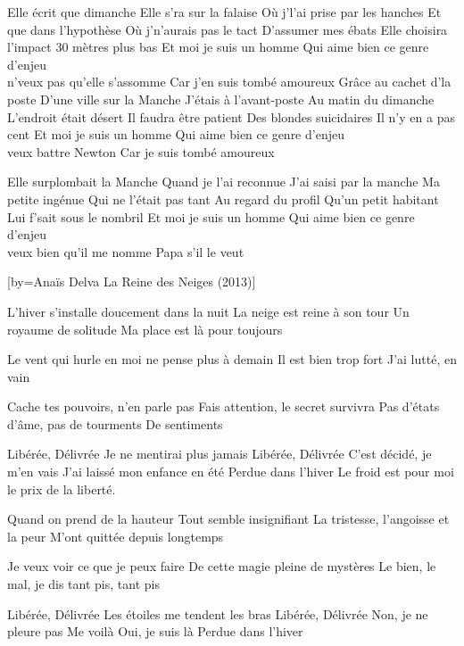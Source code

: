 \beginverse
Elle écrit que dimanche
Elle s'ra sur la falaise
Où j'l'ai prise par les hanches
Et que dans l'hypothèse
Où j'n'aurais pas le tact
D'assumer mes ébats
Elle choisira l'impact
30 mètres plus bas
Et moi je suis un homme
Qui aime bien ce genre d'enjeu
\\[Je] n'veux pas qu'elle s'assomme
Car j'en suis tombé amoureux
Grâce au cachet d'la poste
D'une ville sur la Manche
J'étais à l'avant-poste
Au matin du dimanche
L'endroit était désert
Il faudra être patient
Des blondes suicidaires
Il n'y en a pas cent
Et moi je suis un homme
Qui aime bien ce genre d'enjeu
\\[Je] veux battre Newton
Car je suis tombé amoureux
\endverse

\beginverse
Elle surplombait la Manche
Quand je l'ai reconnue
J'ai saisi par la manche
Ma petite ingénue
Qui ne l'était pas tant
Au regard du profil
Qu'un petit habitant
Lui f'sait sous le nombril
Et moi je suis un homme
Qui aime bien ce genre d'enjeu
\\[Je] veux bien qu'il me nomme
Papa \- s'il le veut
\endverse

[by={Anaïs Delva \- La Reine des Neiges (2013)}]

\beginverse
L'hiver s'installe doucement dans la nuit
La neige est reine à son tour
Un royaume de solitude
Ma place est là pour toujours
\endverse

\beginverse
Le vent qui hurle en moi ne pense plus à demain
Il est bien trop fort
J'ai lutté, en vain
\endverse

\beginverse
Cache tes pouvoirs, n'en parle pas
Fais attention, le secret survivra
Pas d'états d'âme, pas de tourments
De sentiments
\endverse

\beginverse
Libérée, Délivrée
Je ne mentirai plus jamais
Libérée, Délivrée
C'est décidé, je m'en vais
J'ai laissé mon enfance en été
Perdue dans l'hiver
Le froid est pour moi le prix de la liberté.
\endverse

\beginverse
Quand on prend de la hauteur
Tout semble insignifiant
La tristesse, l'angoisse et la peur
M'ont quittée depuis longtemps
\endverse

\beginverse
Je veux voir ce que je peux faire
De cette magie pleine de mystères
Le bien, le mal, je dis tant pis, tant pis
\endverse

\beginverse
Libérée, Délivrée
Les étoiles me tendent les bras
Libérée, Délivrée
Non, je ne pleure pas
Me voilà \!
Oui, je suis là \!
Perdue dans l'hiver
\endverse

